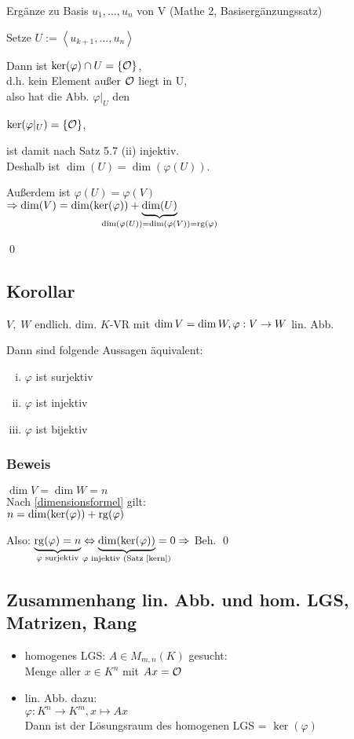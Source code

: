 Ergänze zu Basis $u_1,...,u_n$ von V (Mathe 2, Basisergänzungssatz)

Setze $U:= \left< u_{k+1},..., u_n \right>$

Dann ist $\ker(\varphi) \cap U = \{ \mathcal{O} \}$, \\d.h. kein Element außer $\mathcal{O}$ liegt in U, \\also hat die Abb. $\varphi|_U$ den 

$\ker(\varphi|_U) = \{ \mathcal{O} \}$, 

ist damit nach Satz 5.7 (ii) injektiv. \\
Deshalb ist $\dim(U) = \dim(\varphi(U))$. 

Außerdem ist $\varphi(U) = \varphi(V)$\\
$\Rightarrow \dim(V) = \dim(\ker(\varphi)) + \underbrace{\dim(U)}_{\mathclap{\dim(\varphi(U)) = \dim(\varphi(V)) = \rg(\varphi)}}$

\qed
\subsection{Korollar}
$V,\; W$ endlich. dim. $K$-VR mit $\dim V = \dim W, \; \\\varphi: V \rightarrow W$ lin. Abb. 

Dann sind folgende Aussagen äquivalent:
\begin{enumerate}[(i)]
	\item $\varphi$ ist surjektiv
	\item $\varphi$ ist injektiv
	\item $\varphi$ ist bijektiv
\end{enumerate}

\subsubsection*{Beweis}
$\dim V = \dim W = n$\\

Nach \ref{dimensionsformel} gilt:\\
$n = \dim(\ker(\varphi)) + \mathrm{ rg }(\varphi)$

Also: $\underbrace{\rg(\varphi)=n}_{\mathclap{\varphi \text{ surjektiv}}} \Leftrightarrow \underbrace{\dim(\ker(\varphi))}_{\mathclap{\varphi \text{ injektiv (Satz~\ref{kern}})}} = 0\\
\Rightarrow$ Beh.
\qed

\subsection{Zusammenhang lin. Abb. und hom. LGS, Matrizen, Rang}
\begin{itemize}
	\item homogenes LGS: $A \in M_{m,n}(K)$ gesucht: \\
	Menge aller $x \in K^n$ mit $Ax = \mathcal{O}$
	\item lin. Abb. dazu:\\
	 $\varphi: K^n \rightarrow K^m, x \mapsto Ax$\\
	Dann ist der Lösungsraum des homogenen LGS = $\ker(\varphi)$
\end{itemize}

